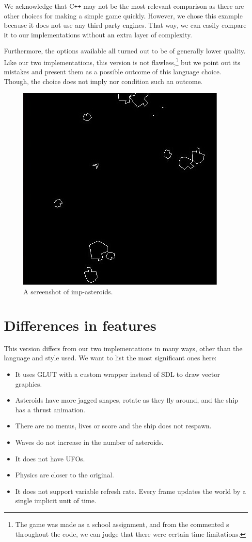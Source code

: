 \documentclass[
  digital, %
  color,   %
  table,   %
  oneside, %
  lof,     %
  lot,     %
]{fithesis3}
\newcommand{\cpp}{C\nolinebreak\texttt{+}\nolinebreak\texttt{+}}
\begin{document}
{We acknowledge that \cpp{} may not be the most relevant comparison
as there are other choices for making a simple game quickly.
However, we chose this example because it does not use any third-party engines.
That way, we can easily compare it to our implementations
without an extra layer of complexity.

Furthermore, the options available all turned out to be of generally lower quality.
Like our two implementations, this version is not flawless,\footnote{
The game was made as a school assignment, and from the commented s
throughout the code, we can judge that there were certain time limitations.}
but we point out its mistakes and present them as a possible outcome of this language choice.
Though, the choice does not imply nor condition such an outcome.

\begin{figure}
    \centering
    \includegraphics[width=0.5 \textwidth]{images/imperative-asteroids.jpg}
    \caption{A screenshot of imp-asteroids.}
    \label{fig:impscreenshot}
\end{figure}



\section{Differences in features}

This version differs from our two implementations in many ways,
other than the language and style used. We want to list the most significant ones here:
\begin{itemize}[--]
    \item It uses GLUT with a custom wrapper instead of SDL to draw vector graphics.
    \item Asteroids have more jagged shapes, rotate as they fly around,
    and the ship has a thrust animation.
    \item There are no menus, lives or score and the ship does not respawn.
    \item Waves do not increase in the number of asteroids.
    \item It does not have UFOs.
    \item Physics are closer to the original.
    \item It does not support variable refresh rate.
    Every frame updates the world by a single implicit unit of time.
\end{itemize}


}
\end{document}
